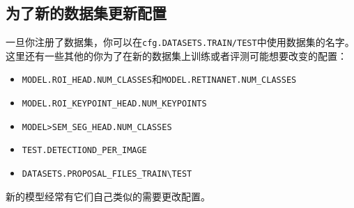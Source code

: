 \documentclass[../main.tex]{subfile}
\begin{document}
\subsection{为了新的数据集更新配置}

一旦你注册了数据集，你可以在\lstinline{cfg.DATASETS.TRAIN/TEST}中使用数据集的名字。这里还有一些其他的你为了在新的数据集上训练或者评测可能想要改变的配置：
\begin{itemize}
    \item \lstinline{MODEL.ROI_HEAD.NUM_CLASSES}和\lstinline{MODEL.RETINANET.NUM_CLASSES}
    \item \lstinline{MODEL.ROI_KEYPOINT_HEAD.NUM_KEYPOINTS}
    \item \lstinline{MODEL>SEM_SEG_HEAD.NUM_CLASSES}
    \item \lstinline{TEST.DETECTIOND_PER_IMAGE}
    \item \lstinline{DATASETS.PROPOSAL_FILES_TRAIN\TEST}
\end{itemize}
新的模型经常有它们自己类似的需要更改配置。
\end{document}
